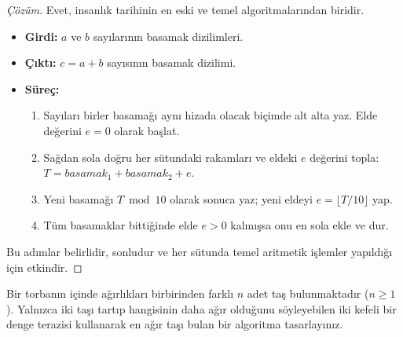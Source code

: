 \begin{proof}[Çözüm]
Evet, insanlık tarihinin en eski ve temel algoritmalarından biridir.
\begin{itemize}
    \item \textbf{Girdi:} $a$ ve $b$ sayılarının basamak dizilimleri.
    \item \textbf{Çıktı:} $c = a + b$ sayısının basamak dizilimi.
    \item \textbf{Süreç:}
    \begin{enumerate}
        \item Sayıları birler basamağı aynı hizada olacak biçimde alt alta yaz. Elde değerini $e = 0$ olarak başlat.
        \item Sağdan sola doğru her sütundaki rakamları ve eldeki $e$ değerini topla: $T = basamak_1 + basamak_2 + e$.
        \item Yeni basamağı $T \bmod 10$ olarak sonuca yaz; yeni eldeyi $e = \lfloor T / 10 \rfloor$ yap.
        \item Tüm basamaklar bittiğinde elde $e > 0$ kalmışsa onu en sola ekle ve dur.
    \end{enumerate}
\end{itemize}
Bu adımlar belirlidir, sonludur ve her sütunda temel aritmetik işlemler yapıldığı için etkindir.
\end{proof}

\begin{example}
Bir torbanın içinde ağırlıkları birbirinden farklı $n$ adet taş bulunmaktadır ($n \ge 1$). Yalnızca iki taşı tartıp hangisinin daha ağır olduğunu söyleyebilen iki kefeli bir denge terazisi kullanarak en ağır taşı bulan bir algoritma tasarlayınız.
\end{example}

